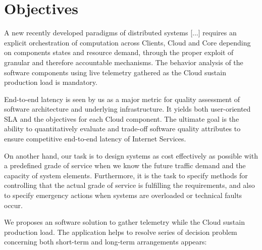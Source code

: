 
\section{Objectives}

A new recently developed paradigms of distributed systems [...] requires an explicit  orchestration of computation across Clients, Cloud and Core depending on components states and resource demand, through the proper exploit of granular and therefore accountable mechanisms. The behavior analysis of the software components using live telemetry gathered as the Cloud sustain production load is mandatory.

End-to-end latency is seen by us as a major metric for quality assessment of software architecture and underlying infrastructure. It yields both user-oriented SLA and the objectives for each Cloud component. The ultimate goal is the ability to quantitatively evaluate and trade-off software quality attributes to ensure competitive end-to-end latency of Internet Services.

On another hand, our task is to design systems as cost effectively as possible with a predefined grade of service when we know the future traffic demand and the capacity of system elements. Furthermore, it is the task to specify methods for controlling that the actual grade of service is fulfilling the requirements, and also to specify emergency actions when systems are overloaded or technical faults occur.

We proposes an software solution to gather telemetry while the Cloud sustain production load. The application helps to resolve series of decision problem concerning both short-term and long-term arrangements appears:

